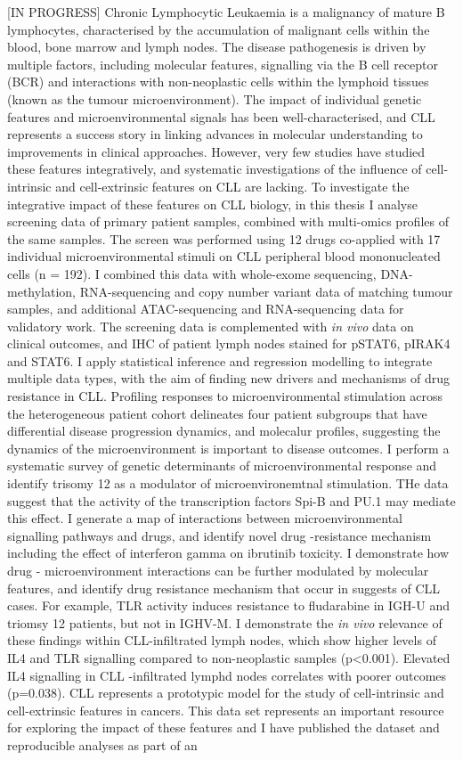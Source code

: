 \documentclass[11pt, a4paper, twosided]{book}
\begin{document}
    {[}IN PROGRESS{]}
    Chronic Lymphocytic Leukaemia is a malignancy of mature B lymphocytes, characterised by the accumulation of malignant cells within the blood, bone marrow and lymph nodes. The disease pathogenesis is driven by multiple factors, including molecular features, signalling via the B cell receptor (BCR) and interactions with non-neoplastic cells within the lymphoid tissues (known as the tumour microenvironment). The impact of individual genetic features and microenvironmental signals has been well-characterised, and CLL represents a success story in linking advances in molecular understanding to improvements in clinical approaches. However, very few studies have studied these features integratively, and systematic investigations of the influence of cell-intrinsic and cell-extrinsic features on CLL are lacking. To investigate the integrative impact of these features on CLL biology, in this thesis I analyse screening data of primary patient samples, combined with multi-omics profiles of the same samples. The screen was performed using 12 drugs co-applied with 17 individual microenvironmental stimuli on CLL peripheral blood mononucleated cells (n = 192). I combined this data with whole-exome sequencing, DNA-methylation, RNA-sequencing and copy number variant data of matching tumour samples, and additional ATAC-sequencing and RNA-sequencing data for validatory work. The screening data is complemented with \emph{in vivo} data on clinical outcomes, and IHC of patient lymph nodes stained for pSTAT6, pIRAK4 and STAT6. I apply statistical inference and regression modelling to integrate multiple data types, with the aim of finding new drivers and mechanisms of drug resistance in CLL. Profiling responses to microenvironmental stimulation across the heterogeneous patient cohort delineates four patient subgroups that have differential disease progression dynamics, and molecalur profiles, suggesting the dynamics of the microenvironment is important to disease outcomes. I perform a systematic survey of genetic determinants of microenvironmental response and identify trisomy 12 as a modulator of microenvironemtnal stimulation. THe data suggest that the activity of the transcription factors Spi-B and PU.1 may mediate this effect. I generate a map of interactions between microenvironmental signalling pathways and drugs, and identify novel drug -resistance mechanism including the effect of interferon gamma on ibrutinib toxicity. I demonstrate how drug - microenvironment interactions can be further modulated by molecular features, and identify drug resistance mechanism that occur in suggests of CLL cases. For example, TLR activity induces resistance to fludarabine in IGH-U and triomsy 12 patients, but not in IGHV-M. I demonstrate the \emph{in vivo} relevance of these findings within CLL-infiltrated lymph nodes, which show higher levels of IL4 and TLR signalling compared to non-neoplastic samples (p\textless0.001). Elevated IL4 signalling in CLL -infiltrated lymphd nodes correlates with poorer outcomes (p=0.038). CLL represents a prototypic model for the study of cell-intrinsic and cell-extrinsic features in cancers. This data set represents an important resource for exploring the impact of these features and I have published the dataset and reproducible analyses as part of an 
\end{document}
